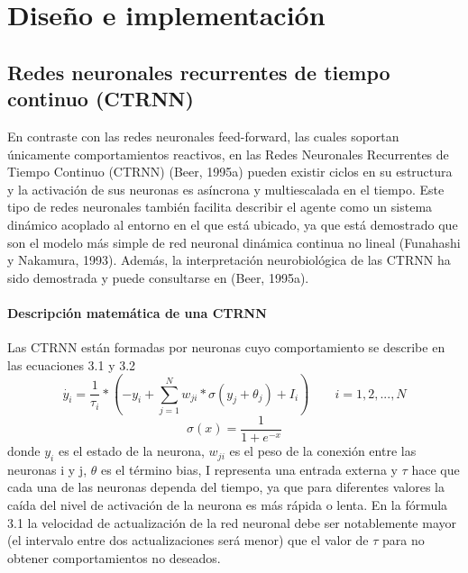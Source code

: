 \chapter{Diseño e implementación}

\section{Redes neuronales recurrentes de tiempo continuo (CTRNN)}
En contraste con las redes neuronales feed-forward, las cuales soportan únicamente comportamientos
reactivos, en las Redes Neuronales Recurrentes de Tiempo Continuo (CTRNN) (Beer,
1995a) pueden existir ciclos en su estructura y la activación de sus neuronas es asíncrona y multiescalada
en el tiempo. Este tipo de redes neuronales también facilita describir el agente como un
sistema dinámico acoplado al entorno en el que está ubicado, ya que está demostrado que son el
modelo más simple de red neuronal dinámica continua no lineal (Funahashi y Nakamura, 1993).
Además, la interpretación neurobiológica de las CTRNN ha sido demostrada y puede consultarse
en (Beer, 1995a).

\subsubsection{Descripción matemática de una CTRNN}
Las CTRNN están formadas por neuronas cuyo comportamiento se describe en las ecuaciones 3.1 y 3.2
\begin{equation} \label{eq:funcionCTRNN}
	\dot{y_{i}}= \frac{1}{\tau_{i}} * \left ( -y_{i}+\sum_{j=1}^{N}w_{ji}*\sigma \left ( y_{j} + \theta _{j} \right ) + I_{i} \right ) \qquad i =1,2,...,N
\end{equation}
\begin{equation} \label{eq:funcionSIGMOIDE}
	\sigma (x)=\frac{1}{1+e^{-x}}
\end{equation}
donde $y_{i}$ es el estado de la neurona, $w_{ji}$ es el peso de la conexión entre las neuronas i y j,
$\theta$ es el término bias, I representa una entrada externa y $\tau$ hace que cada una de las neuronas
dependa del tiempo, ya que para diferentes valores la caída del nivel de activación de la neurona
es más rápida o lenta. En la fórmula 3.1 la velocidad de actualización de la red neuronal debe ser
notablemente mayor (el intervalo entre dos actualizaciones será menor) que el valor de $\tau$ para no
obtener comportamientos no deseados.


